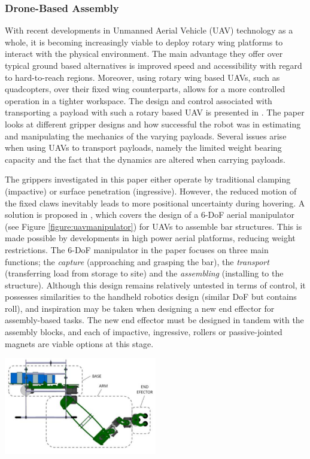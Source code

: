 \documentclass[11pt]{article}
\begin{document}
\subsubsection{Drone-Based Assembly}
With recent developments in Unmanned Aerial Vehicle (UAV) technology as a whole, it is becoming increasingly viable to deploy rotary wing platforms to interact with the physical environment. The main advantage they offer over typical ground based alternatives is improved speed and accessibility with regard to hard-to-reach regions. Moreover, using rotary wing based UAVs, such as quadcopters, over their fixed wing counterparts, allows for a more controlled operation in a tighter workspace. The design and control associated with transporting a payload with such a rotary based UAV is presented in \cite{mellinger2011}. The paper looks at different gripper designs and how successful the robot was in estimating and manipulating the mechanics of the varying payloads. Several issues arise when using UAVs to transport payloads, namely the limited weight bearing capacity and the fact that the dynamics are altered when carrying payloads. 

The grippers investigated in this paper either operate by traditional clamping (impactive) or surface penetration (ingressive). However, the reduced motion of the fixed claws inevitably leads to more positional uncertainty during hovering. A solution is proposed in \cite{cano2013}, which covers the design of a 6-DoF aerial manipulator (see Figure \ref{figure:uavmanipulator}) for UAVs to assemble bar structures. This is made possible by developments in high power aerial platforms, reducing weight restrictions. The 6-DoF manipulator in the paper focuses on three main functions; the \textit{capture} (approaching and grasping the bar), the \textit{transport} (transferring load from storage to site) and the \textit{assembling} (installing to the structure). Although this design remains relatively untested in terms of control, it possesses similarities to the handheld robotics design (similar DoF but contains roll), and inspiration may be taken when designing a new end effector for assembly-based tasks. The new end effector must be designed in tandem with the assembly blocks, and each of impactive, ingressive, rollers or passive-jointed magnets are viable options at this stage.

\begin{center}
\includegraphics[width = 0.5\textwidth]{uavmanipulator.png}
\label{figure:uavmanipulator}
\end{center}
\end{document}
